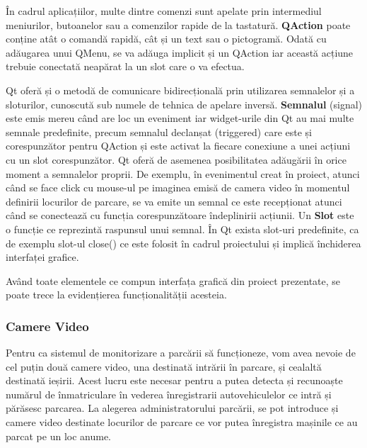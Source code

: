 \documentclass[12pt]{article}
\begin{document}
\^{I}n cadrul aplicațiilor, multe dintre comenzi sunt apelate prin intermediul meniurilor, butoanelor sau a comenzilor rapide de la tastatur\u{a}. \textbf{QAction} poate conține at\^{a}t o comand\u{a} rapid\u{a}, c\^{a}t și un text sau o pictogram\u{a}. Odat\u{a} cu ad\u{a}ugarea unui QMenu, se va ad\u{a}uga implicit și un QAction iar aceast\u{a} acțiune trebuie conectat\u{a} neap\u{a}rat la un slot care o va efectua.

Qt ofer\u{a} și o metod\u{a} de comunicare bidirecțional\u{a} prin utilizarea semnalelor și a sloturilor, cunoscut\u{a} sub numele de tehnica de apelare invers\u{a}. \textbf{Semnalul} (signal) este emis mereu c\^{a}nd are loc un eveniment iar widget-urile din Qt au mai multe semnale predefinite, precum semnalul declanșat (triggered) care este și corespunz\u{a}tor pentru QAction și este activat la fiecare conexiune a unei acțiuni cu un slot corespunz\u{a}tor. Qt ofer\u{a} de asemenea posibilitatea ad\u{a}ug\u{a}rii \^{i}n orice moment a semnalelor proprii. De exemplu, \^{i}n evenimentul creat \^{i}n proiect, atunci c\^{a}nd se face click cu mouse-ul pe imaginea emis\u{a} de camera video \^{i}n momentul definirii locurilor de parcare, se va emite un semnal ce este recepționat atunci c\^{a}nd se conecteaz\u{a} cu funcția corespunz\u{a}toare \^{i}ndeplinirii acțiunii. Un \textbf{Slot} este o funcție ce reprezint\u{a} raspunsul unui semnal. \^{I}n Qt exista slot-uri predefinite, ca de exemplu slot-ul close() ce este folosit \^{i}n cadrul proiectului și implic\u{a} \^{i}nchiderea interfaței grafice.

Av\^{a}nd toate elementele ce compun interfața grafic\u{a} din proiect prezentate, se poate trece la evidențierea funcționalit\u{a}ții acesteia.

\subsubsection{Camere Video}

Pentru ca sistemul de monitorizare a parc\u{a}rii s\u{a} funcționeze, vom avea nevoie de cel puțin dou\u{a} camere video, una destinat\u{a} intr\u{a}rii \^{i}n parcare, și cealalt\u{a} destinat\u{a} ieșirii. Acest lucru este necesar pentru a putea detecta și recunoaște num\u{a}rul de \^{i}nmatriculare  \^{i}n vederea \^{i}nregistrarii autovehiculelor ce intr\u{a} și p\u{a}r\u{a}sesc parcarea. La alegerea administratorului parc\u{a}rii, se pot introduce și camere video destinate locurilor de parcare ce vor putea \^{i}nregistra mașinile ce au parcat pe un loc anume.
\end{document}
